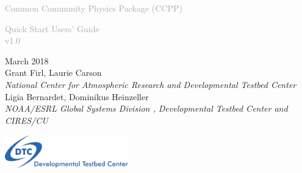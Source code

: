 \begin{titlepage}
\renewcommand{\thefootnote}{\fnsymbol{footnote}}

\vspace*{1em}
\noindent

\begin{center}
\textcolor{darkgray}{\bigsf Common Community Physics Package (CCPP)\\}
\vspace*{1em}\par

\textcolor{darkgray}{\bigst Quick Start Users' Guide \\v1.0}
\vspace*{1em}\par

\large{March 2018}\\[4em]

Grant Firl, Laurie Carson\\
\textit{\small{National Center for Atmospheric Research and Developmental Testbed Center}}\\[4em]

Ligia Bernardet, Dominikus Heinzeller\\
\textit{\small{NOAA/ESRL Global Systems Division , Developmental Testbed Center and CIRES/CU}}\\[4em]

\vspace{4em}

\includegraphics[width=0.4\textwidth]{images/dtc_logo.png}\\[2em]

\end{center}
\end{titlepage}
\pagebreak{}




